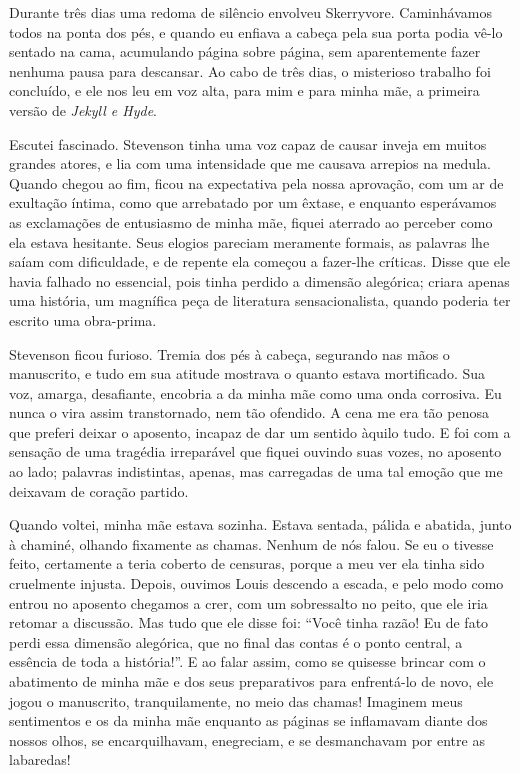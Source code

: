 Durante três dias uma redoma de silêncio envolveu Skerryvore.
Caminhávamos todos na ponta dos pés, e quando eu enfiava a cabeça pela
sua porta podia vê-lo sentado na cama, acumulando página sobre página,
sem aparentemente fazer nenhuma pausa para descansar.  Ao cabo de três
dias, o misterioso trabalho foi concluído, e ele nos leu em voz alta,
para mim e para minha mãe, a primeira versão de \textit{Jekyll e Hyde}.

Escutei fascinado.  Stevenson tinha uma voz capaz de causar inveja em
muitos grandes atores, e lia com uma intensidade que me causava
arrepios na medula.  Quando chegou ao fim, ficou na expectativa pela
nossa aprovação, com um ar de exultação íntima, como que arrebatado por
um êxtase, e enquanto esperávamos as exclamações de entusiasmo de minha
mãe, fiquei aterrado ao perceber como ela estava hesitante.  Seus
elogios pareciam meramente formais, as palavras lhe saíam com
dificuldade, e de repente ela começou a fazer-lhe críticas.  Disse que
ele havia falhado no essencial, pois tinha perdido a dimensão
alegórica; criara apenas uma história, um magnífica peça de literatura
sensacionalista, quando poderia ter escrito uma obra-prima.

Stevenson ficou furioso.  Tremia dos pés à cabeça, segurando nas mãos o
manuscrito, e tudo em sua atitude mostrava o quanto estava mortificado.
 Sua voz, amarga, desafiante, encobria a da minha mãe como uma onda
corrosiva.  Eu nunca o vira assim transtornado, nem tão ofendido.  A
cena me era tão penosa que preferi deixar o aposento, incapaz de dar
um sentido àquilo tudo.  E foi com a sensação de uma tragédia irreparável
que fiquei ouvindo suas vozes, no aposento ao lado; palavras
indistintas, apenas, mas carregadas de uma tal emoção que me deixavam
de coração partido.

Quando voltei, minha mãe estava sozinha.  Estava sentada, pálida e
abatida, junto à chaminé, olhando fixamente as chamas.  Nenhum de nós
falou.  Se eu o tivesse feito, certamente a teria coberto de censuras,
porque a meu ver ela tinha sido cruelmente injusta.  Depois, ouvimos
Louis descendo a escada, e pelo modo como entrou no aposento chegamos a
crer, com um sobressalto no peito, que ele iria retomar a discussão. 
Mas tudo que ele disse foi: “Você tinha razão!  Eu de fato perdi essa
dimensão alegórica, que no final das contas é o ponto central, a
essência de toda a história!”.  E ao falar assim, como se quisesse
brincar com o abatimento de minha mãe e dos seus preparativos para
enfrentá-lo de novo, ele jogou o manuscrito, tranquilamente, no meio
das chamas!  Imaginem meus sentimentos e os da minha mãe enquanto as
páginas se inflamavam diante dos nossos olhos, se encarquilhavam,
enegreciam, e se desmanchavam por entre as labaredas!


